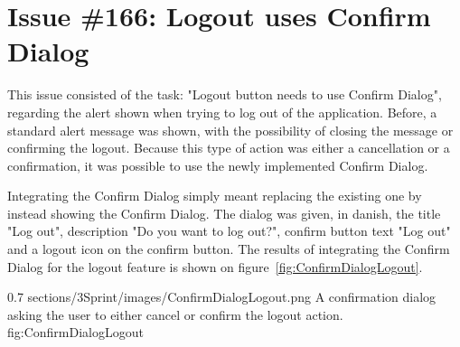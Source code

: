 \section{Issue \#166: Logout uses Confirm Dialog}
This issue consisted of the task: "Logout button needs to use Confirm Dialog", regarding the alert shown when trying to log out of the application. Before, a standard alert message was shown, with the possibility of closing the message or confirming the logout. 
Because this type of action was either a cancellation or a confirmation, it was possible to use the newly implemented Confirm Dialog.

Integrating the Confirm Dialog simply meant replacing the existing one by instead showing the Confirm Dialog. The dialog was given, in danish, the title "Log out", description "Do you want to log out?", confirm button text "Log out" and a logout icon on the confirm button. 
The results of integrating the Confirm Dialog for the logout feature is shown on figure~\ref{fig:ConfirmDialogLogout}.


        {0.7} %
        {sections/3Sprint/images/ConfirmDialogLogout.png} %
        {A confirmation dialog asking the user to either cancel or confirm the logout action.} %
        {fig:ConfirmDialogLogout} %